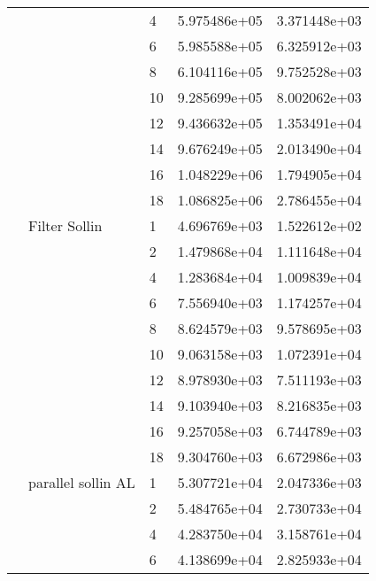 \begin{tabular}{lllrr}
                      &                     & 4  &  5.975486e+05 &  3.371448e+03 \\
                      &                     & 6  &  5.985588e+05 &  6.325912e+03 \\
                      &                     & 8  &  6.104116e+05 &  9.752528e+03 \\
                      &                     & 10 &  9.285699e+05 &  8.002062e+03 \\
                      &                     & 12 &  9.436632e+05 &  1.353491e+04 \\
                      &                     & 14 &  9.676249e+05 &  2.013490e+04 \\
                      &                     & 16 &  1.048229e+06 &  1.794905e+04 \\
                      &                     & 18 &  1.086825e+06 &  2.786455e+04 \\
                      & Filter Sollin & 1  &  4.696769e+03 &  1.522612e+02 \\
                      &                     & 2  &  1.479868e+04 &  1.111648e+04 \\
                      &                     & 4  &  1.283684e+04 &  1.009839e+04 \\
                      &                     & 6  &  7.556940e+03 &  1.174257e+04 \\
                      &                     & 8  &  8.624579e+03 &  9.578695e+03 \\
                      &                     & 10 &  9.063158e+03 &  1.072391e+04 \\
                      &                     & 12 &  8.978930e+03 &  7.511193e+03 \\
                      &                     & 14 &  9.103940e+03 &  8.216835e+03 \\
                      &                     & 16 &  9.257058e+03 &  6.744789e+03 \\
                      &                     & 18 &  9.304760e+03 &  6.672986e+03 \\
                      & parallel sollin AL & 1  &  5.307721e+04 &  2.047336e+03 \\
                      &                     & 2  &  5.484765e+04 &  2.730733e+04 \\
                      &                     & 4  &  4.283750e+04 &  3.158761e+04 \\
                      &                     & 6  &  4.138699e+04 &  2.825933e+04 \\

\end{tabular}
